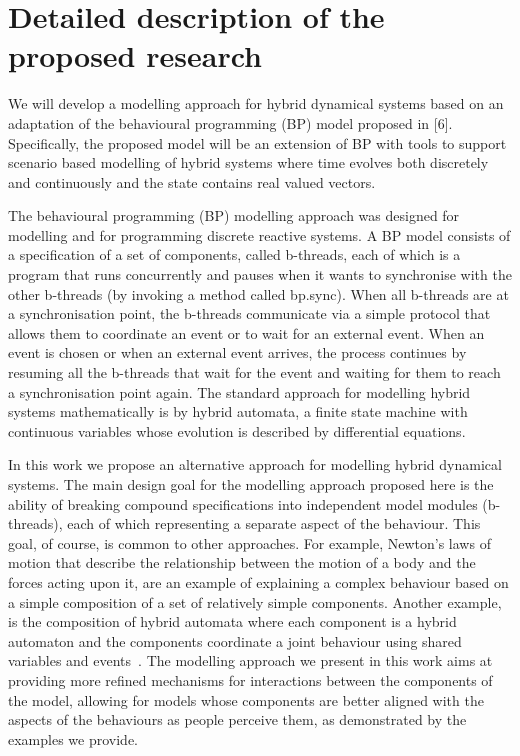 \documentclass[11pt]{article}
\newcounter{example}
\begin{document}
\section{Detailed description of the proposed research}
We will develop a modelling approach for hybrid dynamical systems based on an adaptation of the behavioural programming (BP) model proposed in [6]. Specifically, the proposed model will be an extension of BP with tools to support scenario based modelling of hybrid systems where time evolves both discretely and continuously and the state contains real valued vectors.

The behavioural programming (BP) modelling approach was designed for modelling and for programming discrete reactive systems. A BP model consists of a specification of a set of components, called b-threads, each of which is a program that runs concurrently and pauses when it wants to synchronise with the other b-threads (by invoking a method called bp.sync). When all b-threads are at a synchronisation point, the b-threads communicate via a simple protocol that allows them to coordinate an event or to wait for an external event. When an event is chosen or when an external event arrives, the process continues by resuming all the b-threads that wait for the event and waiting for them to reach a synchronisation point again.
The standard approach for modelling hybrid systems mathematically is by hybrid automata, a finite state machine with continuous variables whose evolution is described by differential equations. 

In this work we propose an alternative approach for modelling hybrid dynamical systems. The main design goal for the modelling approach proposed here is the ability of breaking compound specifications into independent model modules (b-threads), each of which representing a separate aspect of the behaviour. This goal, of course, is common to other approaches. For example, Newton's laws of motion that describe the relationship between the motion of a body and the forces acting upon it, are an example of explaining a complex behaviour based on a simple composition of a set of relatively simple components. Another example, is the composition of hybrid automata where each component is a hybrid automaton and the components coordinate a joint behaviour using shared variables and events~\cite{DBLP:conf/hybrid/WeissA07}. The modelling approach we present in this work aims at providing more refined mechanisms for interactions between the components of the model, allowing for models whose components are better aligned with the aspects of the behaviours as people perceive them, as demonstrated by the examples we provide. 
\end{document}
